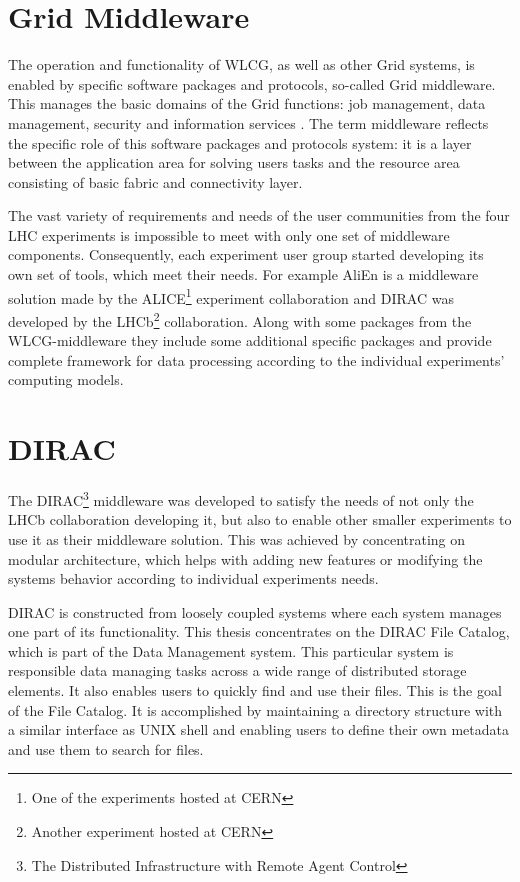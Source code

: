 \section*{Grid Middleware}

The operation and functionality of WLCG, as well as other Grid systems, is enabled by specific software packages 
and protocols, so-called Grid middleware. This manages the basic domains of the Grid functions: job management, 
data management, security and information services \cite{GriCom}. The term middleware reflects the specific role 
of this software packages and protocols system: it is a layer between the application area for solving users tasks 
and the resource area consisting of basic fabric and connectivity layer. 

The vast variety of requirements and needs of the user communities from the four LHC experiments is impossible to 
meet with only one set of middleware components. Consequently, each experiment user group started developing its 
own set of tools, which meet their needs. For example AliEn is a middleware solution made by the 
ALICE\footnote{One of the experiments hosted at CERN} experiment collaboration and DIRAC was developed by the 
LHCb\footnote{Another experiment hosted at CERN} collaboration. Along with some packages from the WLCG-middleware 
they include some additional specific packages and provide complete framework for data processing according to the 
individual experiments' computing models.

\section*{DIRAC}

The DIRAC\footnote{The Distributed Infrastructure with Remote Agent Control} middleware was developed to satisfy
the needs of not only the LHCb collaboration developing it, but also to enable other smaller experiments to use
it as their middleware solution. This was achieved by concentrating on modular architecture, which helps with
adding new features or modifying the systems behavior according to individual experiments needs. 

DIRAC is constructed from loosely coupled systems where each system manages one part of its functionality. This 
thesis concentrates on the DIRAC File Catalog, which is part of the Data Management system. This particular system 
is responsible data managing tasks across a wide range of distributed storage elements. It also enables users to 
quickly find and use their files. This is the goal of the File Catalog. It is accomplished by maintaining a 
directory structure with a similar interface as UNIX shell and enabling users to define their own metadata
and use them to search for files.

